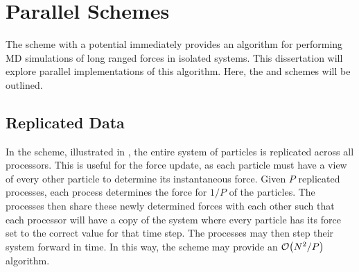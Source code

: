 \section{Parallel Schemes}

%
The \velocityverlet{} scheme with a \twobody{} potential
immediately provides an algorithm for
performing MD simulations of long ranged forces in isolated systems.
%
This dissertation will explore parallel implementations of this algorithm.
%
Here, the \replicateddata{} and \systolicloop{} schemes will be outlined.



\subsection{Replicated Data}
\label{sec:background:subsec:replicated_data}

%
In the \replicateddata{} scheme, illustrated in
,
the entire system of particles is replicated across all processors.
%
This is useful for the force update, as each particle must have a view of
every other particle to determine its instantaneous force.
%
Given $P$ replicated processes,
each process determines the force for $1/P$ of the particles.
%
The processes then share these newly determined forces with each other
such that each processor will have a copy of the system where every
particle has its force set to the correct value for that time step.
%
The processes may then step their system forward in time.
%
In this way, the \replicateddata{} scheme may provide
an $\mathcal{O}{\left({ N^2/P }\right)}$ algorithm.


